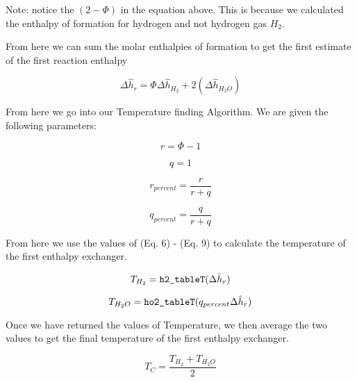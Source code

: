 \documentclass[12pt, Times New Roman]{article}
\begin{document}
    Note: notice the $(2-\Phi)$ in the equation above. This is because we calculated the enthalpy of formation for hydrogen and not 
    hydrogen gas $H_{2}$.
    
    \vspace*{6pt}

    From here we can sum the molar enthalpies of formation to get the first estimate of the first reaction enthalpy

    \begin{equation}
        \Delta \hat{h}_{r} = \Phi \Delta \hat{h}_{H_{2}} + 2(\Delta \hat{h}_{H_{2}O})
    \end{equation}

    From here we go into our Temperature finding Algorithm. We are given the following parameters:

    \begin{equation}
        r = \Phi - 1
    \end{equation}

    \begin{equation}
        q = 1 
    \end{equation}

    \begin{equation}
        r_{percent} = \frac{r}{r+q}
    \end{equation}

    \begin{equation}
        q_{percent} = \frac{q}{r+q}
    \end{equation}

    From here we use the values of (Eq. 6) - (Eq. 9) to calculate the temperature of the first enthalpy exchanger.

    \begin{equation}
        T_{H_{2}} = \verb|h2_tableT|(\Delta \hat{h}_{r})
    \end{equation}

    \begin{equation}
        T_{H_{2}O} = \verb|ho2_tableT|(q_{percent} \Delta \hat{h}_{r})
    \end{equation}

    Once we have returned the values of Temperature, we then average the two values to get the final temperature of the first enthalpy exchanger.

    \begin{equation}
        T_{C} = \frac{T_{H_{2}} + T_{H_{2}O}}{2}
    \end{equation}
\end{document}

